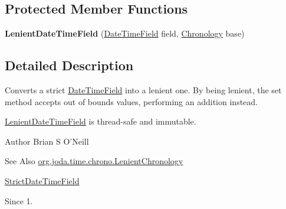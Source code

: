 \subsection*{Protected Member Functions}
\begin{DoxyCompactItemize}
\item 
\hypertarget{classorg_1_1joda_1_1time_1_1field_1_1_lenient_date_time_field_a8da92b16b10088d10b0193674e0c02d0}{{\bfseries Lenient\-Date\-Time\-Field} (\hyperlink{classorg_1_1joda_1_1time_1_1_date_time_field}{Date\-Time\-Field} field, \hyperlink{classorg_1_1joda_1_1time_1_1_chronology}{Chronology} base)}\label{classorg_1_1joda_1_1time_1_1field_1_1_lenient_date_time_field_a8da92b16b10088d10b0193674e0c02d0}

\end{DoxyCompactItemize}


\subsection{Detailed Description}
Converts a strict \hyperlink{classorg_1_1joda_1_1time_1_1_date_time_field}{Date\-Time\-Field} into a lenient one. By being lenient, the set method accepts out of bounds values, performing an addition instead. 

\hyperlink{classorg_1_1joda_1_1time_1_1field_1_1_lenient_date_time_field}{Lenient\-Date\-Time\-Field} is thread-\/safe and immutable.

\begin{DoxyAuthor}{Author}
Brian S O'Neill 
\end{DoxyAuthor}
\begin{DoxySeeAlso}{See Also}
\hyperlink{classorg_1_1joda_1_1time_1_1chrono_1_1_lenient_chronology}{org.\-joda.\-time.\-chrono.\-Lenient\-Chronology} 

\hyperlink{classorg_1_1joda_1_1time_1_1field_1_1_strict_date_time_field}{Strict\-Date\-Time\-Field} 
\end{DoxySeeAlso}
\begin{DoxySince}{Since}
1. 
\end{DoxySince}


